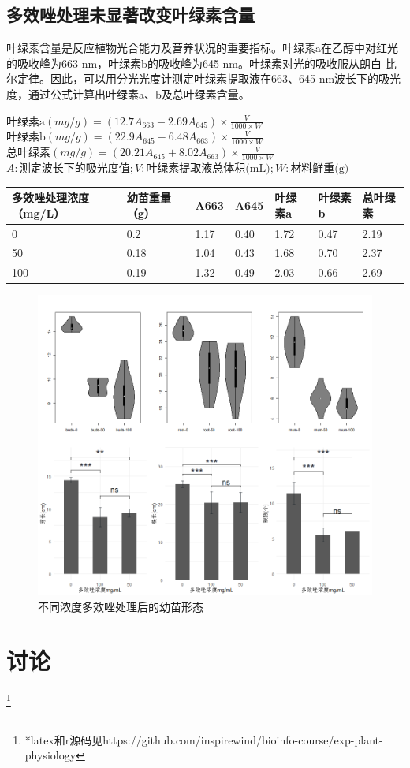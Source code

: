 \documentclass[UTF8]{ctexart}
\begin{document}
    \subsection{多效唑处理未显著改变叶绿素含量}
    叶绿素含量是反应植物光合能力及营养状况的重要指标。叶绿素a在乙醇中对红光的吸收峰为663 nm，叶绿素b的吸收峰为645 nm。叶绿素对光的吸收服从朗白-比尔定律。因此，可以用分光光度计测定叶绿素提取液在663、645 nm波长下的吸光度，通过公式计算出叶绿素a、b及总叶绿素含量。
    \begin{center}
        $\mbox{叶绿素a}(mg/g)=(12.7A_{663}-2.69A_{645}) \times \frac{V}{1000 \times W} $
        $\mbox{叶绿素b}(mg/g)=(22.9A_{645}-6.48A_{663}) \times \frac{V}{1000 \times W} $
        $\mbox{总叶绿素}(mg/g)=(20.21A_{645}+8.02A_{663}) \times \frac{V}{1000 \times W} $
        \\ $A:\mbox{测定波长下的吸光度值}; V:\mbox{叶绿素提取液总体积(mL)}; W:\mbox{材料鲜重(g)}$
    \end{center}
    \begin{table}[!h]
        \centering
        \begin{tabular}{lllllll}
        \hline
        多效唑处理浓度（mg/L） & 幼苗重量（g） & A663 & A645 & 叶绿素a & 叶绿素b & 总叶绿素 \\ \hline
        0             & 0.2     & 1.17 & 0.40 & 1.72 & 0.47 & 2.19 \\
        50            & 0.18    & 1.04 & 0.43 & 1.68 & 0.70 & 2.37 \\
        100           & 0.19    & 1.32 & 0.49 & 2.03 & 0.66 & 2.69 \\ \hline
        \end{tabular}
    \end{table}

   
    \begin{figure}[!h]
        \centering
        \caption{不同浓度多效唑处理后的幼苗形态}
        \setlength{\abovecaptionskip}{0pt}
        \includegraphics[scale=0.6]{comb.png}
    \end{figure}

    \section{讨论}
    \footnote{*latex和r源码见https://github.com/inspirewind/bioinfo-course/exp-plant-physiology}
\end{document}
